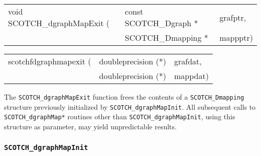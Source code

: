 \begin{itemize}
\progsyn

{\tt\begin{tabular}{l@{}ll}
void SCOTCH\_dgraphMapExit ( & const SCOTCH\_Dgraph * & grafptr, \\
                             & SCOTCH\_Dmapping *     & mappptr)
\end{tabular}}

{\tt\begin{tabular}{l@{}ll}
scotchfdgraphmapexit ( & doubleprecision (*) & grafdat, \\
                       & doubleprecision (*) & mappdat)
\end{tabular}}

\progdes

The {\tt SCOTCH\_dgraphMapExit} function frees the contents of a
{\tt SCOTCH\_\lbt Dmapping} structure previously initialized by
{\tt SCOTCH\_\lbt dgraph\lbt Map\lbt Init}. All subsequent calls to
{\tt SCOTCH\_\lbt dgraph\lbt Map*} routines other than
{\tt SCOTCH\_\lbt dgraph\lbt Map\lbt Init}, using this structure
as parameter, may yield unpredictable results.
\end{itemize}

\subsubsection{{\tt SCOTCH\_dgraphMapInit}}
\label{sec-lib-dgraph-map-init}

